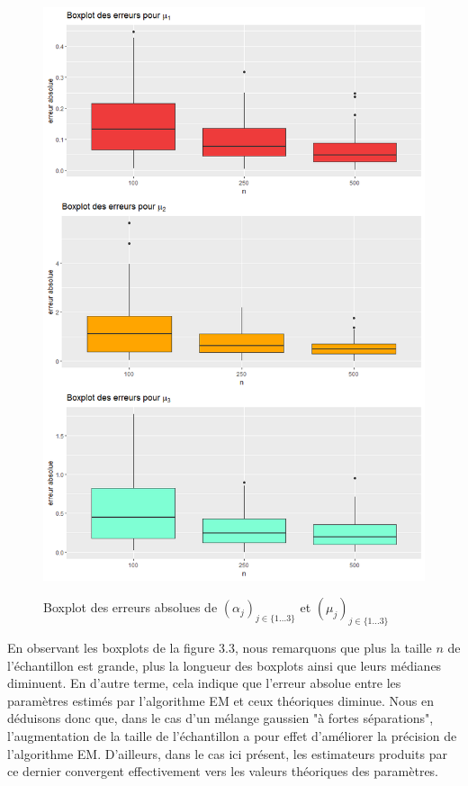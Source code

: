 \documentclass[frenchb]{report}
\newcommand{\1}{\mathbbm{1}}
\theoremstyle{definition}\newtheorem{defn}{Définition}
\theoremstyle{definition}\newtheorem{exm}{Exemple}
\theoremstyle{definition}\newtheorem{nota}{Notation}
\theoremstyle{definition}\newtheorem{rem}{Remarque}
\begin{document}
\begin{figure}[htp]
{		\includegraphics[scale=0.35]{images/good_mu.png}%
		\label{fig:b}%
	}%
	\caption{Boxplot des erreurs absolues de $(\alpha_j)_{j \in  \{1\dots3\}}$ et $(\mu_j)_{j \in \{1\dots3\}}$}
\end{figure}

En observant les boxplots de la figure 3.3, nous remarquons que plus la taille $n$ de l'échantillon est grande, plus la longueur des boxplots ainsi que leurs médianes diminuent. En d'autre terme, cela indique que l'erreur absolue entre les paramètres estimés par l'algorithme EM et ceux théoriques diminue. Nous en déduisons donc que, dans le cas d'un mélange gaussien "à fortes séparations", l'augmentation de la taille de l'échantillon a pour effet d'améliorer la précision de l'algorithme EM. D'ailleurs, dans le cas ici présent, les estimateurs produits par ce dernier convergent effectivement vers les valeurs théoriques des paramètres.
\newpage
\end{document}
